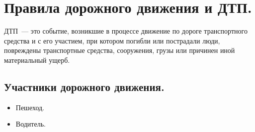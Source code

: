\documentclass[12pt]{article}
\begin{document}
	\tableofcontents
	\setcounter{tocdepth}{3}
	\newpage
	\section{Правила дорожного движения и ДТП.}
	\begin{definition}
		ДТП~--- это событие, возникшие в процессе движение по дороге транспортного средства и с его участием, при котором погибли или пострадали люди, повреждены транспортные средства, сооружения, грузы или причинен иной материальный ущерб.
	\end{definition}
	\subsection{Участники дорожного движения.}
	\begin{itemize}
		\item Пешеход.
		\item Водитель.
	\end{itemize}
\end{document}
